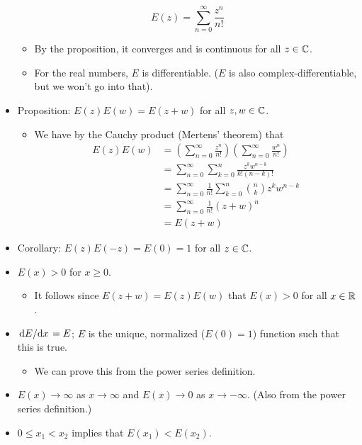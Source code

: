 \documentclass[../notes.tex]{subfiles}
\begin{document}
\begin{itemize}
    \begin{equation*}
        E(z) = \sum_{n=0}^\infty\frac{z^n}{n!}
    \end{equation*}
    \begin{itemize}
        \item By the proposition, it converges and is continuous for all $z\in\mathbb{C}$.
        \item For the real numbers, $E$ is differentiable. ($E$ is also complex-differentiable, but we won't go into that).
    \end{itemize}
    \item Proposition: $E(z)E(w)=E(z+w)$ for all $z,w\in\mathbb{C}$.
    \begin{itemize}
        \item We have by the Cauchy product (Mertens' theorem) that
        \begin{align*}
            E(z)E(w) &= \left( \sum_{n=0}^\infty\frac{z^n}{n!} \right)\left( \sum_{n=0}^\infty\frac{w^n}{n!} \right)\\
            &= \sum_{n=0}^\infty\sum_{k=0}^n\frac{z^kw^{n-k}}{k!(n-k)!}\\
            &= \sum_{n=0}^\infty\frac{1}{n!}\sum_{k=0}^n\binom{n}{k}z^kw^{n-k}\\
            &= \sum_{n=0}^\infty\frac{1}{n!}(z+w)^n\\
            &= E(z+w)
        \end{align*}
    \end{itemize}
    \item Corollary: $E(z)E(-z)=E(0)=1$ for all $z\in\mathbb{C}$.
    \item $E(x)>0$ for $x\geq 0$.
    \begin{itemize}
        \item It follows since $E(z+w)=E(z)E(w)$ that $E(x)>0$ for all $x\in\mathbb{R}$.
    \end{itemize}
    \item $\dv*{E}{x}=E$; $E$ is the unique, normalized ($E(0)=1$) function such that this is true.
    \begin{itemize}
        \item We can prove this from the power series definition.
    \end{itemize}
    \item $E(x)\to\infty$ as $x\to\infty$ and $E(x)\to 0$ as $x\to -\infty$. (Also from the power series definition.)
    \item $0\leq x_1<x_2$ implies that $E(x_1)<E(x_2)$.
    \begin{itemize}

\end{itemize}
\end{itemize}
\end{document}
